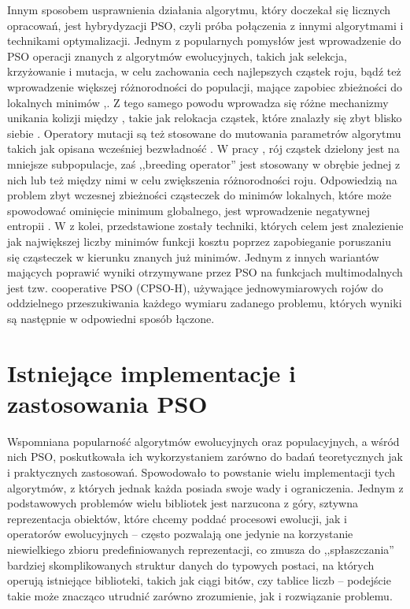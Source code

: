 \documentclass[12pt, twoside, openany, abstract=on]{report}
\theoremstyle{definition}
\begin{document}
Innym sposobem usprawnienia działania algorytmu, który doczekał się licznych opracowań, jest hybrydyzacji PSO, czyli próba połączenia z innymi algorytmami i technikami optymalizacji. Jednym z popularnych pomysłów jest wprowadzenie do PSO operacji znanych z algorytmów ewolucyjnych, takich jak selekcja, krzyżowanie i mutacja, w celu zachowania cech najlepszych cząstek roju, bądź też wprowadzenie większej różnorodności do populacji, mające zapobiec zbieżności do lokalnych minimów \cite{SelectionPso},\cite{HybridPsoBreedingSubpop}. Z tego samego powodu wprowadza się różne mechanizmy unikania kolizji między \cite{CollisionAvoiding}, takie jak relokacja cząstek, które znalazły się zbyt blisko siebie \cite{PsoCriticality}. Operatory mutacji są też stosowane do mutowania 
 parametrów algorytmu takich jak opisana wcześniej bezwładność \cite{EPso}. W pracy \cite{HybridPsoBreedingSubpop}, rój cząstek dzielony jest na mniejsze subpopulacje, zaś ,,breeding operator'' 
  jest stosowany w obrębie jednej z nich lub też między nimi w celu zwiększenia różnorodności roju. Odpowiedzią na problem zbyt wczesnej zbieżności cząsteczek do minimów lokalnych, które może spowodować ominięcie minimum globalnego, jest wprowadzenie negatywnej entropii \cite{DissipativePso}. W \cite{ComputGlobOptPso} z kolei, przedstawione zostały techniki, których celem jest znalezienie jak największej liczby minimów funkcji kosztu poprzez zapobieganie poruszaniu się cząsteczek w kierunku znanych już minimów.
Jednym z innych wariantów mających poprawić wyniki otrzymywane przez PSO na funkcjach multimodalnych 
 jest tzw. cooperative PSO (CPSO-H), używające jednowymiarowych rojów do oddzielnego przeszukiwania każdego wymiaru zadanego problemu, których wyniki są następnie w odpowiedni sposób łączone.

\section{Istniejące implementacje i zastosowania PSO}


Wspomniana popularność algorytmów ewolucyjnych oraz populacyjnych, a wśród nich PSO, poskutkowała ich wykorzystaniem zarówno do badań teoretycznych jak i praktycznych zastosowań. Spowodowało to powstanie wielu implementacji tych algorytmów, z których jednak każda posiada swoje wady i ograniczenia. Jednym z podstawowych problemów wielu bibliotek jest narzucona z góry, sztywna reprezentacja obiektów, które chcemy poddać procesowi ewolucji, jak i operatorów ewolucyjnych – często pozwalają one jedynie na korzystanie niewielkiego zbioru predefiniowanych reprezentacji, co zmusza do ,,spłaszczania'' bardziej skomplikowanych struktur danych do typowych postaci, na których operują istniejące biblioteki, takich jak ciągi bitów, czy tablice liczb – podejście takie może znacząco utrudnić zarówno zrozumienie, jak i rozwiązanie problemu.
\end{document}

